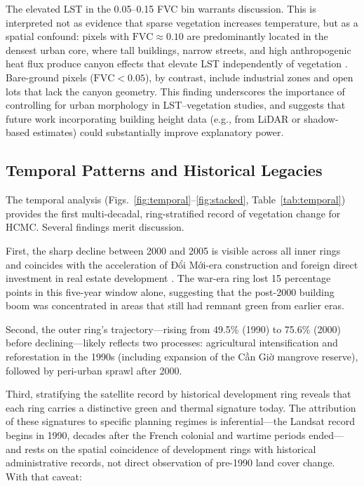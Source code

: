 \documentclass[preprint,12pt]{elsarticle}
\begin{document}
The elevated LST in the 0.05--0.15 FVC bin warrants discussion. This is interpreted not as evidence that sparse vegetation increases temperature, but as a spatial confound: pixels with $\text{FVC} \approx 0.10$ are predominantly located in the densest urban core, where tall buildings, narrow streets, and high anthropogenic heat flux produce canyon effects that elevate LST independently of vegetation \citep{oke1982}. Bare-ground pixels ($\text{FVC} < 0.05$), by contrast, include industrial zones and open lots that lack the canyon geometry. This finding underscores the importance of controlling for urban morphology in LST--vegetation studies, and suggests that future work incorporating building height data (e.g., from LiDAR or shadow-based estimates) could substantially improve explanatory power.

\subsection{Temporal Patterns and Historical Legacies}

The temporal analysis (Figs.~\ref{fig:temporal}--\ref{fig:stacked}, Table~\ref{tab:temporal}) provides the first multi-decadal, ring-stratified record of vegetation change for HCMC. Several findings merit discussion.

First, the sharp decline between 2000 and 2005 is visible across all inner rings and coincides with the acceleration of Đổi Mới-era construction and foreign direct investment in real estate development \citep{waibel2006}. The war-era ring lost 15 percentage points in this five-year window alone, suggesting that the post-2000 building boom was concentrated in areas that still had remnant green from earlier eras.

Second, the outer ring's trajectory---rising from 49.5\% (1990) to 75.6\% (2000) before declining---likely reflects two processes: agricultural intensification and reforestation in the 1990s (including expansion of the Cần Giờ mangrove reserve), followed by peri-urban sprawl after 2000.

Third, stratifying the satellite record by historical development ring reveals that each ring carries a distinctive green and thermal signature today. The attribution of these signatures to specific planning regimes is inferential---the Landsat record begins in 1990, decades after the French colonial and wartime periods ended---and rests on the spatial coincidence of development rings with historical administrative records, not direct observation of pre-1990 land cover change. With that caveat:
\end{document}
